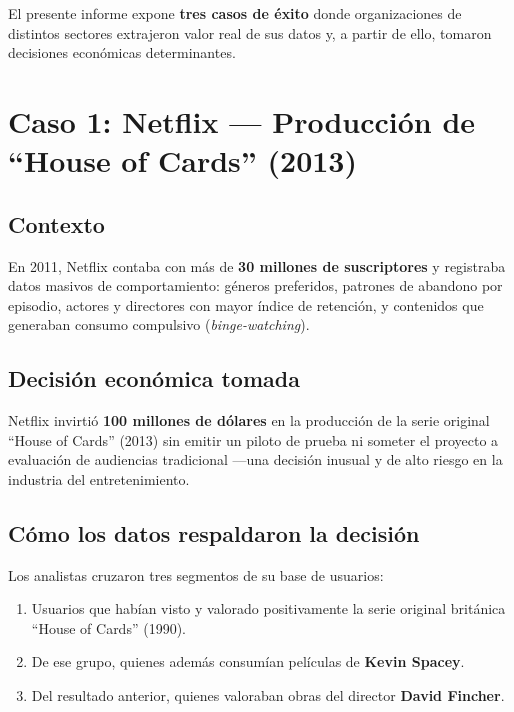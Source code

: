 \documentclass[12pt, a4paper]{article}
\begin{document}
\begin{infobox}
El presente informe expone \textbf{tres casos de éxito} donde organizaciones de distintos sectores extrajeron valor real de sus datos y, a partir de ello, tomaron decisiones económicas determinantes.
\end{infobox}


\section{Caso 1: Netflix --- Producción de ``House of Cards'' (2013)}

\subsection{Contexto}

En 2011, Netflix contaba con más de \textbf{30 millones de suscriptores} y registraba datos masivos de comportamiento: géneros preferidos, patrones de abandono por episodio, actores y directores con mayor índice de retención, y contenidos que generaban consumo compulsivo (\textit{binge-watching}).

\subsection{Decisión económica tomada}

Netflix invirtió \textbf{100 millones de dólares} en la producción de la serie original ``House of Cards'' (2013) sin emitir un piloto de prueba ni someter el proyecto a evaluación de audiencias tradicional ---una decisión inusual y de alto riesgo en la industria del entretenimiento.

\subsection{Cómo los datos respaldaron la decisión}

Los analistas cruzaron tres segmentos de su base de usuarios:

\begin{enumerate}[label=(\alph*), leftmargin=2cm]
  \item Usuarios que habían visto y valorado positivamente la serie original británica ``House of Cards'' (1990).
  \item De ese grupo, quienes además consumían películas de \textbf{Kevin Spacey}.
  \item Del resultado anterior, quienes valoraban obras del director \textbf{David Fincher}.
\end{enumerate}
\end{document}
